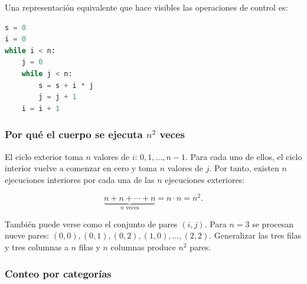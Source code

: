 \documentclass[12pt,letterpaper]{article}
\begin{document}
Una representación equivalente que hace visibles las operaciones de control es:

\begin{lstlisting}[style=codigo,language=Python,caption={Representación equivalente con ciclos while}]
s = 0
i = 0
while i < n:
    j = 0
    while j < n:
        s = s + i * j
        j = j + 1
    i = i + 1
\end{lstlisting}

\subsubsection{Por qué el cuerpo se ejecuta \texorpdfstring{$n^2$}{n²} veces}

El ciclo exterior toma $n$ valores de $i$: $0,1,\ldots,n-1$. Para cada uno de ellos, el ciclo interior vuelve a comenzar en cero y toma $n$ valores de $j$. Por tanto, existen $n$ ejecuciones interiores por cada una de las $n$ ejecuciones exteriores:

\[
\underbrace{n+n+\cdots+n}_{n\text{ veces}}=n\cdot n=n^2.
\]

También puede verse como el conjunto de pares $(i,j)$. Para $n=3$ se procesan nueve pares: $(0,0),(0,1),(0,2),(1,0),\ldots,(2,2)$. Generalizar las tres filas y tres columnas a $n$ filas y $n$ columnas produce $n^2$ pares.

\subsubsection{Conteo por categorías}
\end{document}
